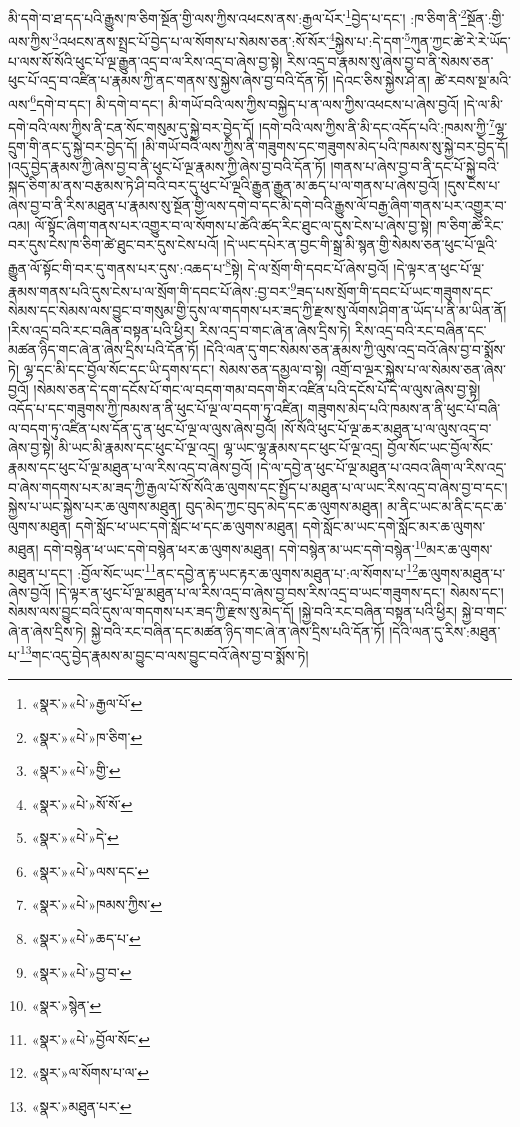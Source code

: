 མི་དགེ་བ་ཐ་དད་པའི་རྒྱུས་ཁ་ཅིག་སྔོན་གྱི་ལས་ཀྱིས་འཕངས་ནས་:རྒྱལ་པོར་\footnote{«སྣར་»«པེ་»རྒྱལ་པོ་}བྱེད་པ་དང་། :ཁ་ཅིག་ནི་\footnote{«སྣར་»«པེ་»ཁ་ཅིག་}སྔོན་:གྱི་ལས་ཀྱིས་\footnote{«སྣར་»«པེ་»གྱི་}འཕངས་ནས་སྤྲང་པོ་བྱེད་པ་ལ་སོགས་པ་སེམས་ཅན་:སོ་སོར་\footnote{«སྣར་»«པེ་»སོ་སོ་}སྐྱེས་པ་:དེ་དག་\footnote{«སྣར་»«པེ་»དེ་}ཀུན་ཀྱང་ཚེ་རེ་རེ་ཡོད་པ་ལས་སོ་སོའི་ཕུང་པོ་ལྔ་རྒྱུན་འདྲ་བ་ལ་རིས་འདྲ་བ་ཞེས་བྱ་སྟེ། རིས་འདྲ་བ་རྣམས་སུ་ཞེས་བྱ་བ་ནི་སེམས་ཅན་ཕུང་པོ་འདྲ་བ་འཛིན་པ་རྣམས་ཀྱི་ནང་གནས་སུ་སྐྱེས་ཞེས་བྱ་བའི་དོན་ཏོ། །དེའང་ཅིས་སྐྱེས་ཤེ་ན། ཚེ་རབས་སྔ་མའི་ལས་\footnote{«སྣར་»«པེ་»ལས་དང་}དགེ་བ་དང་། མི་དགེ་བ་དང་། མི་གཡོ་བའི་ལས་ཀྱིས་བསྐྱེད་པ་ན་ལས་ཀྱིས་འཕངས་པ་ཞེས་བྱའོ། །དེ་ལ་མི་དགེ་བའི་ལས་ཀྱིས་ནི་ངན་སོང་གསུམ་དུ་སྐྱེ་བར་བྱེད་དོ། །དགེ་བའི་ལས་ཀྱིས་ནི་མི་དང་འདོད་པའི་:ཁམས་ཀྱི་\footnote{«སྣར་»«པེ་»ཁམས་ཀྱིས་}ལྷ་དྲུག་གི་ནང་དུ་སྐྱེ་བར་བྱེད་དོ། །མི་གཡོ་བའི་ལས་ཀྱིས་ནི་གཟུགས་དང་གཟུགས་མེད་པའི་ཁམས་སུ་སྐྱེ་བར་བྱེད་དོ། །འདུ་བྱེད་རྣམས་ཀྱི་ཞེས་བྱ་བ་ནི་ཕུང་པོ་ལྔ་རྣམས་ཀྱི་ཞེས་བྱ་བའི་དོན་ཏོ། །གནས་པ་ཞེས་བྱ་བ་ནི་དང་པོ་སྐྱེ་བའི་སྐད་ཅིག་མ་ནས་བརྩམས་ཏེ་ཤི་བའི་བར་དུ་ཕུང་པོ་ལྔའི་རྒྱུན་རྒྱུན་མ་ཆད་པ་ལ་གནས་པ་ཞེས་བྱའོ། །དུས་ངེས་པ་ཞེས་བྱ་བ་ནི་རིས་མཐུན་པ་རྣམས་སུ་སྔོན་གྱི་ལས་དགེ་བ་དང་མི་དགེ་བའི་རྒྱུས་ལོ་བརྒྱ་ཞིག་གནས་པར་འགྱུར་བ་འམ། ལོ་སྟོང་ཞིག་གནས་པར་འགྱུར་བ་ལ་སོགས་པ་ཚེའི་ཚད་རིང་ཐུང་ལ་དུས་ངེས་པ་ཞེས་བྱ་སྟེ། ཁ་ཅིག་ཚེ་རིང་བར་དུས་ངེས་ཁ་ཅིག་ཚེ་ཐུང་བར་དུས་ངེས་པའོ། །དེ་ཡང་དཔེར་ན་བྱང་གི་སྒྲ་མི་སྙན་གྱི་སེམས་ཅན་ཕུང་པོ་ལྔའི་རྒྱུན་ལོ་སྟོང་གི་བར་དུ་གནས་པར་དུས་:འཆད་པ་\footnote{«སྣར་»«པེ་»ཆད་པ་}སྟེ། དེ་ལ་སྲོག་གི་དབང་པོ་ཞེས་བྱའོ། །དེ་ལྟར་ན་ཕུང་པོ་ལྔ་རྣམས་གནས་པའི་དུས་ངེས་པ་ལ་སྲོག་གི་དབང་པོ་ཞེས་:བྱ་བར་\footnote{«སྣར་»«པེ་»བྱ་བ་}ཟད་པས་སྲོག་གི་དབང་པོ་ཡང་གཟུགས་དང་སེམས་དང་སེམས་ལས་བྱུང་བ་གསུམ་གྱི་དུས་ལ་གདགས་པར་ཟད་ཀྱི་རྫས་སུ་ལོགས་ཤིག་ན་ཡོད་པ་ནི་མ་ཡིན་ནོ། །རིས་འདྲ་བའི་རང་བཞིན་བསྟན་པའི་ཕྱིར། རིས་འདྲ་བ་གང་ཞེ་ན་ཞེས་དྲིས་ཏེ། རིས་འདྲ་བའི་རང་བཞིན་དང་མཚན་ཉིད་གང་ཞེ་ན་ཞེས་དྲིས་པའི་དོན་ཏོ། །དེའི་ལན་དུ་གང་སེམས་ཅན་རྣམས་ཀྱི་ལུས་འདྲ་བའོ་ཞེས་བྱ་བ་སྨོས་ཏེ། ལྷ་དང་མི་དང་བྱོལ་སོང་དང་ཡི་དྭགས་དང་། སེམས་ཅན་དམྱལ་བ་སྟེ། འགྲོ་བ་ལྔར་སྐྱེས་པ་ལ་སེམས་ཅན་ཞེས་བྱའོ། །སེམས་ཅན་དེ་དག་དངོས་པོ་གང་ལ་བདག་གམ་བདག་གིར་འཛིན་པའི་དངོས་པོ་དེ་ལ་ལུས་ཞེས་བྱ་སྟེ། འདོད་པ་དང་གཟུགས་ཀྱི་ཁམས་ན་ནི་ཕུང་པོ་ལྔ་ལ་བདག་ཏུ་འཛིན། གཟུགས་མེད་པའི་ཁམས་ན་ནི་ཕུང་པོ་བཞི་ལ་བདག་ཏུ་འཛིན་པས་དོན་དུ་ན་ཕུང་པོ་ལྔ་ལ་ལུས་ཞེས་བྱའོ། །སོ་སོའི་ཕུང་པོ་ལྔ་ཆར་མཐུན་པ་ལ་ལུས་འདྲ་བ་ཞེས་བྱ་སྟེ། མི་ཡང་མི་རྣམས་དང་ཕུང་པོ་ལྔ་འདྲ། ལྷ་ཡང་ལྷ་རྣམས་དང་ཕུང་པོ་ལྔ་འདྲ། བྱོལ་སོང་ཡང་བྱོལ་སོང་རྣམས་དང་ཕུང་པོ་ལྔ་མཐུན་པ་ལ་རིས་འདྲ་བ་ཞེས་བྱའོ། །དེ་ལ་དབྱེ་ན་ཕུང་པོ་ལྔ་མཐུན་པ་འབའ་ཞིག་ལ་རིས་འདྲ་བ་ཞེས་གདགས་པར་མ་ཟད་ཀྱི་རྒྱལ་པོ་སོ་སོའི་ཆ་ལུགས་དང་སྤྱོད་པ་མཐུན་པ་ལ་ཡང་རིས་འདྲ་བ་ཞེས་བྱ་བ་དང་། སྐྱེས་པ་ཡང་སྐྱེས་པར་ཆ་ལུགས་མཐུན། བུད་མེད་ཀྱང་བུད་མེད་དང་ཆ་ལུགས་མཐུན། མ་ནིང་ཡང་མ་ནིང་དང་ཆ་ལུགས་མཐུན། དགེ་སློང་ཕ་ཡང་དགེ་སློང་ཕ་དང་ཆ་ལུགས་མཐུན། དགེ་སློང་མ་ཡང་དགེ་སློང་མར་ཆ་ལུགས་མཐུན། དགེ་བསྙེན་ཕ་ཡང་དགེ་བསྙེན་ཕར་ཆ་ལུགས་མཐུན། དགེ་བསྙེན་མ་ཡང་དགེ་བསྙེན་\footnote{«སྣར་»སྙེན་}མར་ཆ་ལུགས་མཐུན་པ་དང་། :བྱོལ་སོང་ཡང་\footnote{«སྣར་»«པེ་»བྱོལ་སོང་}ནང་དབྱེ་ན་རྟ་ཡང་རྟར་ཆ་ལུགས་མཐུན་པ་:ལ་སོགས་པ་\footnote{«སྣར་»ལ་སོགས་པ་ལ་}ཆ་ལུགས་མཐུན་པ་ཞེས་བྱའོ། །དེ་ལྟར་ན་ཕུང་པོ་ལྔ་མཐུན་པ་ལ་རིས་འདྲ་བ་ཞེས་བྱ་བས་རིས་འདྲ་བ་ཡང་གཟུགས་དང་། སེམས་དང་། སེམས་ལས་བྱུང་བའི་དུས་ལ་གདགས་པར་ཟད་ཀྱི་རྫས་སུ་མེད་དོ། །སྐྱེ་བའི་རང་བཞིན་བསྟན་པའི་ཕྱིར། སྐྱེ་བ་གང་ཞེ་ན་ཞེས་དྲིས་ཏེ། སྐྱེ་བའི་རང་བཞིན་དང་མཚན་ཉིད་གང་ཞེ་ན་ཞེས་དྲིས་པའི་དོན་ཏོ། །དེའི་ལན་དུ་རིས་:མཐུན་པ་\footnote{«སྣར་»མཐུན་པར་}གང་འདུ་བྱེད་རྣམས་མ་བྱུང་བ་ལས་བྱུང་བའོ་ཞེས་བྱ་བ་སྨོས་ཏེ། 